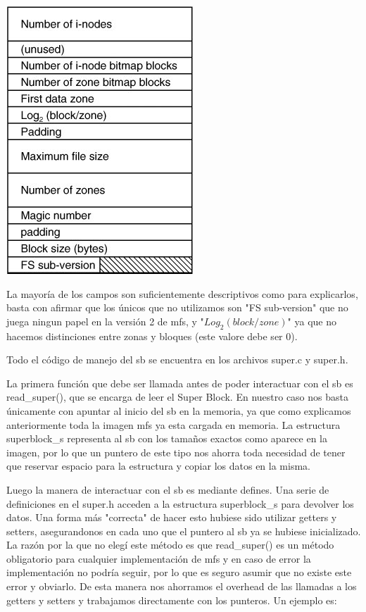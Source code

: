 \begin{center}
\includegraphics[scale=0.7]{../img/superblock.png}
\end{center}

La mayoría de los campos son suficientemente descriptivos como para explicarlos,
basta con afirmar que los únicos que no utilizamos son "FS sub-version" que no
juega ningun papel en la versión 2 de mfs, y "$Log_2 (block/zone)$" ya que no
hacemos distinciones entre zonas y bloques (este valore debe ser 0).

Todo el código de manejo del sb se encuentra en los archivos super.c y super.h.

La primera función que debe ser llamada antes de poder interactuar con el sb es
read\_super(), que se encarga de leer el Super Block. En nuestro caso nos basta
únicamente con apuntar al inicio del sb en la memoria, ya que como explicamos
anteriormente toda la imagen mfs ya esta cargada en memoria. La estructura
superblock\_s representa al sb con los tamaños exactos como aparece en la
imagen, por lo que un puntero de este tipo nos ahorra toda necesidad de tener
que reservar espacio para la estructura y copiar los datos en la misma.

Luego la manera de interactuar con el sb es mediante defines. Una serie de
definiciones en el super.h acceden a la estructura superblock\_s para devolver
los datos. Una forma más "correcta" de hacer esto hubiese sido utilizar getters
y setters, asegurandonos en cada uno que el puntero al sb ya se hubiese
inicializado. La razón por la que no elegí este método es que read\_super() es
un método obligatorio para cualquier implementación de mfs y en caso de error la
implementación no podría seguir, por lo que es seguro asumir que no existe este
error y obviarlo. De esta manera nos ahorramos el overhead de las llamadas a los
getters y setters y trabajamos directamente con los punteros. Un ejemplo es:

